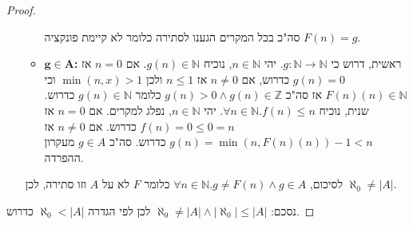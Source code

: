 \documentclass[]{article}
\newcommand\N     {\mathbb{N}}
\newcommand\Z     {\mathbb{Z}}
\newcommand\az    {\aleph_0}
\begin{document}
\begin{proof}
\begin{itemize}
\begin{itemize}
\begin{itemize}
			\end{itemize}
			סה"כ בכל המקרים הגענו לסתירה כלומר לא קיימת פונקציה $ F(n) = g $. 
			\item $ \bm{g \in A} $\textbf{: }ראשית, דרוש כי $ g \colon \N \to \N $. יהי $ n \in \N $, נוכיח $ g(n) \in \N $. אם $ n = 0 $ אז $ g(n) = 0 $ כדרוש, אם $ n \neq 0 $ אז $ n \le 1 $ ולכן $ \min(n, x) > 1 $ וכי $ F(n)(n) \in \N $ אז סה"כ $ g(n) > 0 \land g(n) \in \Z $ כלומר $ g(n) \in \N $ כדרוש. שנית, נוכיח $ \forall n \in \N. f(n) \le n $. יהי $ n \in \N $, נפלג למקרים. אם $ n = 0 $ אז $ f(n) = 0 \le 0 = n $ כדרוש. אם $ n \neq 0 $ אז $ g(n) = \min(n, F(n)(n)) - 1 < n $ כדרוש. סה"כ $ g \in A $ מעקרון ההפרדה. 
		\end{itemize}
		לסיכום, $ \forall n \in \N. g \neq F(n) \land g \in A$ כלומר $ F $ לא על $ A $ וזו סתירה, לכן $ \az \neq |A| $. 
	\end{itemize}
	נסכם: $ \az \neq |A| \land |\az| \le |A| $ לכן לפי הגדרה $ \az < |A| $ כדרוש. 
\end{proof}
\end{document}
